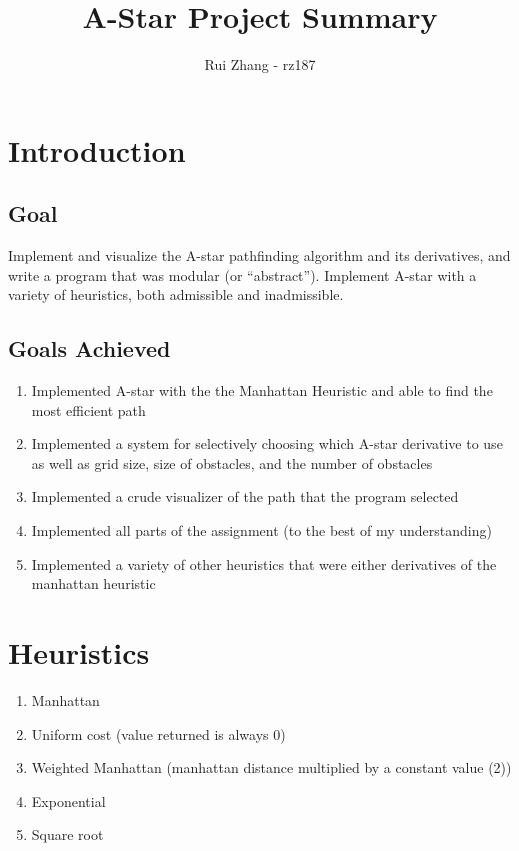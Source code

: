 \documentclass{article}
\begin{document}
\title{A-Star Project Summary}
\author{Rui Zhang - rz187}
\maketitle
\section{Introduction}
\subsection{Goal}
Implement and visualize the A-star pathfinding algorithm and its derivatives,
and write a program that was modular (or ``abstract''). Implement A-star with
a variety of heuristics, both admissible and inadmissible.
\subsection{Goals Achieved}
\begin{enumerate}
    \item Implemented A-star with the the Manhattan Heuristic and able to find
        the most efficient path
    \item Implemented a system for selectively choosing which A-star derivative
        to use as well as grid size, size of obstacles, and the number of obstacles
    \item Implemented a crude visualizer of the path that the program selected
    \item Implemented all parts of the assignment (to the best of my understanding)
    \item Implemented a variety of other heuristics that were either derivatives
        of the manhattan heuristic
\end{enumerate}
\section{Heuristics}
\begin{enumerate}
    \item Manhattan
    \item Uniform cost (value returned is always 0)
    \item Weighted Manhattan (manhattan distance multiplied by a constant value (2))
    \item Exponential
    \item Square root
\end{enumerate}
\end{document}
